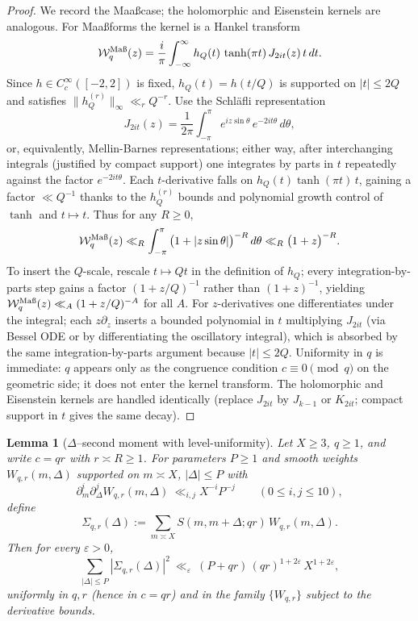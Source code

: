 \documentclass[11pt]{article}
\newtheorem{lemma}{Lemma}[part]
\theoremstyle{definition}
\theoremstyle{remark}
\numberwithin{equation}{part}
\begin{document}
\begin{proof}
	We record the Maa\ss case; the holomorphic and Eisenstein kernels are analogous. For Maa\ss forms the kernel is a Hankel transform
	\[
		\mathcal W_{q}^{\mathrm{Ma\text\ss}}(z)
		= \frac{i}{\pi}\int_{-\infty}^{\infty} h_Q(t)\,\tanh(\pi t)\,J_{2it}(z)\,t\,dt.
	\]
	Since $h\in C_c^\infty([-2,2])$ is fixed, $h_Q(t)=h(t/Q)$ is supported on $|t|\le 2Q$ and satisfies $\|h_Q^{(r)}\|_\infty\ll_r Q^{-r}$. Use the Schl\"afli representation
	\[
		J_{2it}(z)=\frac{1}{2\pi}\int_{-\pi}^{\pi} e^{iz\sin\theta}\,e^{-2it\theta}\,d\theta,
	\]
	or, equivalently, Mellin-Barnes representations; either way, after interchanging integrals (justified by compact support) one integrates by parts in $t$ repeatedly against the factor $e^{-2it\theta}$. Each $t$-derivative falls on $h_Q(t)\tanh(\pi t)\,t$, gaining a factor $\ll Q^{-1}$ thanks to the $h_Q^{(r)}$ bounds and polynomial growth control of $\tanh$ and $t\mapsto t$. Thus for any $R\ge0$,
	\[
		\mathcal W_{q}^{\mathrm{Ma\text\ss}}(z) \ll_R \int_{-\pi}^{\pi} \big(1+|z\sin\theta|\big)^{-R}\,d\theta
		\ll_R \big(1+z\big)^{-R}.
	\]
	To insert the $Q$-scale, rescale $t\mapsto Qt$ in the definition of $h_Q$; every integration-by-parts step gains a factor $(1+z/Q)^{-1}$ rather than $(1+z)^{-1}$, yielding
	$\mathcal W_{q}^{\mathrm{Ma\text\ss}}(z)\ll_A (1+z/Q)^{-A}$ for all $A$. For $z$-derivatives one differentiates under the integral; each $z\partial_z$ inserts a bounded polynomial in $t$ multiplying $J_{2it}$ (via Bessel ODE or by differentiating the oscillatory integral), which is absorbed by the same integration-by-parts argument because $|t|\le 2Q$. Uniformity in $q$ is immediate: $q$ appears only as the congruence condition $c\equiv 0\pmod q$ on the geometric side; it does not enter the kernel transform. The holomorphic and Eisenstein kernels are handled identically (replace $J_{2it}$ by $J_{k-1}$ or $K_{2it}$; compact support in $t$ gives the same decay).
\end{proof}


\begin{lemma}[$\Delta$--second moment with level-uniformity]\label{lem:delta-second-moment-fullyrigid}
	Let $X\ge3$, $q\ge1$, and write $c=qr$ with $r\asymp R\ge1$. For parameters $P\ge1$ and smooth weights $W_{q,r}(m,\Delta)$ supported on $m\asymp X$, $|\Delta|\le P$ with
	\[
		\partial_m^i\partial_\Delta^j W_{q,r}(m,\Delta)\ \ll_{i,j} X^{-i}P^{-j}\qquad(0\le i,j\le 10),
	\]
	define
	\[
		\Sigma_{q,r}(\Delta):=\sum_{m\asymp X} S(m,m+\Delta;qr)\,W_{q,r}(m,\Delta).
	\]
	Then for every $\varepsilon>0$,
	\[
		\sum_{|\Delta|\le P} |\Sigma_{q,r}(\Delta)|^2
		\ \ll_{\varepsilon}\ (P+qr)\,(qr)^{1+2\varepsilon}\,X^{1+2\varepsilon},
	\]
	uniformly in $q,r$ (hence in $c=qr$) and in the family $\{W_{q,r}\}$ subject to the derivative bounds.
\end{lemma}
\end{document}
